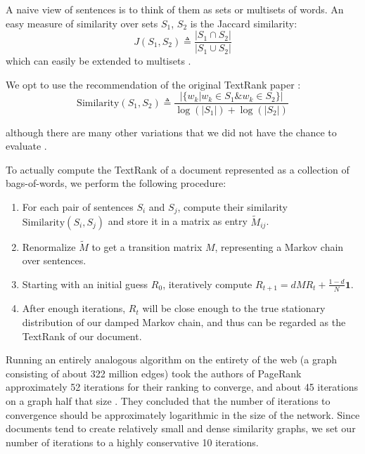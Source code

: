 A naive view of sentences is to think of them as sets or multisets of words.
An easy measure of similarity over sets $S_1$, $S_2$ is the Jaccard similarity:
\begin{equation*}
  J(S_1, S_2) \triangleq \frac{|S_1 \cap S_2|}{|S_1 \cup S_2|}
\end{equation*}
which can easily be extended to multisets \cite{wiki:Multiset}.

We opt to use the recommendation of the original TextRank paper \cite{textrank}:
\begin{equation*}
  \text{Similarity}(S_1, S_2) \triangleq \frac{ | \{ w_k | w_k \in S_1 \& w_k \in S_2 \} |}{\log(|S_1|) + \log(|S_2|)}
\end{equation*}

although there are many other variations that we did not have the chance to evaluate \cite{textrank-sim-var}.

To actually compute the TextRank of a document represented as a collection of bags-of-words, we perform the following procedure:
\begin{enumerate}
\item For each pair of sentences $S_i$ and $S_j$, compute their similarity $\text{Similarity}(S_i, S_j)$ and store it in a matrix as entry $\tilde{M}_{ij}$.
\item Renormalize $\tilde{M}$ to get a transition matrix $M$, representing a Markov chain over sentences.
\item Starting with an initial guess $R_0$, iteratively compute $R_{t+1} = dMR_t + \frac{1-d}{N} \mathbf{1}$.
\item After enough iterations, $R_t$ will be close enough to the true stationary distribution of our damped Markov chain, and thus can be regarded as the TextRank of our document.
\end{enumerate}

Running an entirely analogous algorithm on the entirety of the web (a graph consisting of about 322 million edges) took the authors of PageRank approximately 52 iterations for their ranking to converge, and about 45 iterations on a graph half that size \cite{wiki:PageRank}. 
They concluded that the number of iterations to convergence should be approximately logarithmic in the size of the network.
Since documents tend to create relatively small and dense similarity graphs, we set our number of iterations to a highly conservative 10 iterations.
